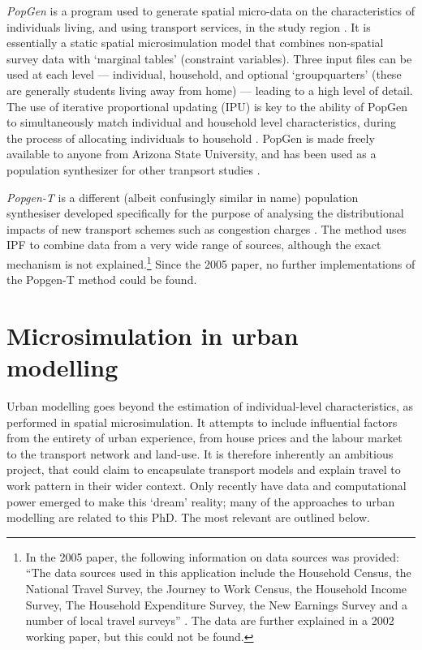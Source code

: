 \emph{PopGen} is a program used
to generate spatial micro-data on the characteristics of individuals
living, and using transport services, in the study region
\citep{Ravulaparthy2011}. It 
is essentially a static spatial microsimulation model that combines non-spatial
survey data with `marginal tables'
(constraint variables). Three input files can be used at each level ---
individual, household, and optional `groupquarters'
(these are generally students living away from home) --- leading to a high level of
detail. The use of iterative proportional updating (IPU) is key to the
ability of PopGen to simultaneously match individual and household level
characteristics, during the process of allocating individuals to household
\citep{ye2009methodology}. PopGen is made freely available to
anyone from Arizona State University, and has been used as a population
synthesizer for other tranpsort studies \citep{pendyala2012application}.

\emph{Popgen-T} is a different (albeit confusingly similar in name) population
synthesiser developed specifically for the purpose of analysing the
distributional impacts of new transport schemes such as congestion charges
\citep{Bonsall2005}. The method uses IPF to combine data from a very wide range
of sources, although the exact mechanism is not
explained.\footnote{In the 2005 paper, the following information on
data sources was provided: ``The data sources used in this application include the
Household Census, the National Travel Survey, the Journey to Work Census,
the Household Income Survey, The Household Expenditure Survey,
the New Earnings Survey and a number of local travel surveys'' \citep[p.~410]{Bonsall2005}.
The data are further explained in a 2002 working paper, but this could not
be found.} Since the 2005 paper, no further implementations of the Popgen-T method
could be found.




\section{Microsimulation in urban modelling}
\label{s:urbanmodel}
Urban modelling goes beyond the estimation of individual-level
characteristics, as performed in spatial microsimulation.
It attempts to include influential factors from the entirety of
urban experience, from house prices and the labour market to
the transport network and land-use. It is therefore inherently
an ambitious project, that could claim to encapsulate transport models
and explain travel to work pattern in their wider context.
Only recently have data and computational power emerged to
make this `dream' reality; many of the approaches to urban
modelling are related to this PhD. The most relevant are outlined below.

